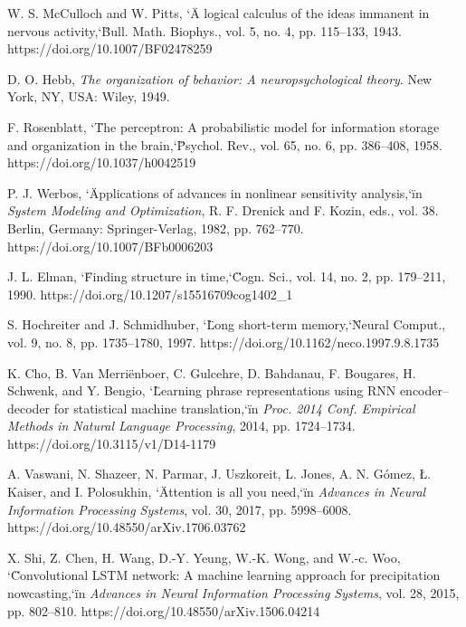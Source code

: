 \documentclass[spanish,a4paper,12pt,oneside]{extreport}
\begin{document}

\begin{thebibliography}{X}
W. S. McCulloch and W. Pitts, \char`\"A logical calculus of the ideas immanent in nervous activity,\char`\" Bull. Math. Biophys., vol. 5, no. 4, pp. 115–133, 1943. https://doi.org/10.1007/BF02478259

D. O. Hebb, \textit{The organization of behavior: A neuropsychological theory}. New York, NY, USA: Wiley, 1949.

F. Rosenblatt, \char`\"The perceptron: A probabilistic model for information storage and organization in the brain,\char`\" Psychol. Rev., vol. 65, no. 6, pp. 386–408, 1958. https://doi.org/10.1037/h0042519

P. J. Werbos, \char`\"Applications of advances in nonlinear sensitivity analysis,\char`\" in \textit{System Modeling and Optimization}, R. F. Drenick and F. Kozin, eds., vol. 38. Berlin, Germany: Springer-Verlag, 1982, pp. 762–770. https://doi.org/10.1007/BFb0006203

J. L. Elman, \char`\"Finding structure in time,\char`\" Cogn. Sci., vol. 14, no. 2, pp. 179–211, 1990. https://doi.org/10.1207/s15516709cog1402\_1

S. Hochreiter and J. Schmidhuber, \char`\"Long short-term memory,\char`\" Neural Comput., vol. 9, no. 8, pp. 1735–1780, 1997. https://doi.org/10.1162/neco.1997.9.8.1735

K. Cho, B. Van Merriënboer, C. Gulcehre, D. Bahdanau, F. Bougares, H. Schwenk, and Y. Bengio, \char`\"Learning phrase representations using RNN encoder–decoder for statistical machine translation,\char`\" in \textit{Proc. 2014 Conf. Empirical Methods in Natural Language Processing}, 2014, pp. 1724–1734. https://doi.org/10.3115/v1/D14-1179

A. Vaswani, N. Shazeer, N. Parmar, J. Uszkoreit, L. Jones, A. N. Gómez, Ł. Kaiser, and I. Polosukhin, \char`\"Attention is all you need,\char`\" in \textit{Advances in Neural Information Processing Systems}, vol. 30, 2017, pp. 5998–6008. https://doi.org/10.48550/arXiv.1706.03762

X. Shi, Z. Chen, H. Wang, D.-Y. Yeung, W.-K. Wong, and W.-c. Woo, \char`\"Convolutional LSTM network: A machine learning approach for precipitation nowcasting,\char`\" in \textit{Advances in Neural Information Processing Systems}, vol. 28, 2015, pp. 802–810. https://doi.org/10.48550/arXiv.1506.04214


\end{thebibliography}
\end{document}
